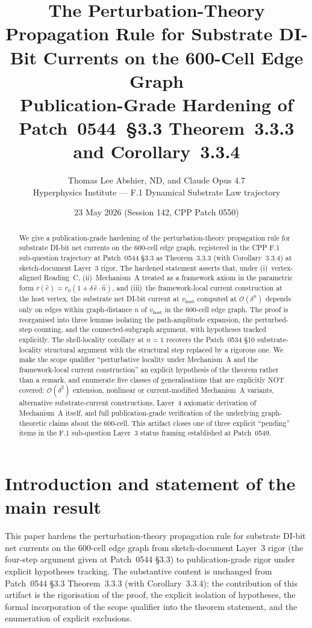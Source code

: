 \documentclass[11pt,letterpaper]{article}
\title{The Perturbation-Theory Propagation Rule for Substrate DI-Bit Currents on the 600-Cell Edge Graph \\
\large Publication-Grade Hardening of Patch~0544~\S3.3 Theorem~3.3.3 and Corollary~3.3.4}
\author{Thomas Lee Abshier, ND, and Claude Opus 4.7\\Hyperphysics Institute --- F.1 Dynamical Substrate Law trajectory}
\date{23 May 2026 (Session 142, CPP Patch 0550)}
\newcommand{\nhat}{\hat{n}}
\newcommand{\vhost}{v_{\text{host}}}
\newcommand{\Eorder}[1]{\mathcal{O}(\delta^{#1})}
\begin{document}
\maketitle

\begin{abstract}
We give a publication-grade hardening of the perturbation-theory propagation rule for substrate DI-bit net currents on the 600-cell edge graph, registered in the CPP F.1 sub-question trajectory at Patch~0544 \S3.3 as Theorem~3.3.3 (with Corollary~3.3.4) at sketch-document Layer~3 rigor. The hardened statement asserts that, under (i)~vertex-aligned Reading~C, (ii)~Mechanism~A treated as a framework axiom in the parametric form $r(\hat{e}) = r_0(1 + \delta\,\hat{e}\cdot\nhat)$, and (iii)~the framework-local current construction at the host vertex, the substrate net DI-bit current at $\vhost$ computed at $\Eorder{n}$ depends only on edges within graph-distance $n$ of $\vhost$ in the 600-cell edge graph. The proof is reorganised into three lemmas isolating the path-amplitude expansion, the perturbed-step counting, and the connected-subgraph argument, with hypotheses tracked explicitly. The shell-locality corollary at $n=1$ recovers the Patch~0534 \S10 substrate-locality structural argument with the structural step replaced by a rigorous one. We make the scope qualifier ``perturbative locality under Mechanism~A and the framework-local current construction'' an explicit hypothesis of the theorem rather than a remark, and enumerate five classes of generalisations that are explicitly NOT covered: $\Eorder{2}$ extension, nonlinear or current-modified Mechanism~A variants, alternative substrate-current constructions, Layer~4 axiomatic derivation of Mechanism~A itself, and full publication-grade verification of the underlying graph-theoretic claims about the 600-cell. This artifact closes one of three explicit ``pending'' items in the F.1 sub-question Layer~3 status framing established at Patch~0549.
\end{abstract}

\section{Introduction and statement of the main result}\label{sec:introduction}

This paper hardens the perturbation-theory propagation rule for substrate DI-bit net currents on the 600-cell edge graph from sketch-document Layer~3 rigor (the four-step argument given at Patch~0544 \S3.3) to publication-grade rigor under explicit hypotheses tracking. The substantive content is unchanged from Patch~0544 \S3.3 Theorem~3.3.3 (with Corollary~3.3.4); the contribution of this artifact is the rigorisation of the proof, the explicit isolation of hypotheses, the formal incorporation of the scope qualifier into the theorem statement, and the enumeration of explicit exclusions.
\end{document}
